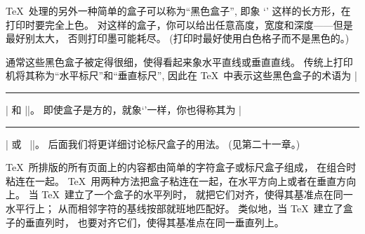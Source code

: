 \smallbreak
\TeX\ 处理的另外一种简单的盒子可以称为``黑色盒子'', 即象%
`\thinspace \vrule width 4pt height 6pt depth 1.5pt \thinspace'%
这样的长方形，在打印时要完全上色。%
对这样的盒子，你可以给出任意高度，宽度和深度——但是最好别太大，
否则打印墨可能耗尽。%
(打印时最好使用白色格子而不是黑色的。)

通常这些黑色盒子被定得很细，使得看起来象水平直线或垂直直线。%
传统上打印机将其称为``水平标尺''和``垂直标尺'',
因此在 \TeX\ 中表示这些黑色盒子的术语为 |\hrule| 和 |\vrule|。%
即使盒子是方的，就象`\thinspace\bull\thinspace'一样，你也得称其为 |\hrule| 或%
~|\vrule|。%
后面我们将更详细讨论标尺盒子的用法。%
(见第二十一章。)

\smallbreak
\TeX\ 所排版的所有页面上的内容都由简单的字符盒子或标尺盒子组成，
在组合时粘连在一起。%
\TeX\ 用两种方法把盒子粘连在一起，{在水平方向上}或者{在垂直方向上}。%
当 \TeX\ 建立了一个盒子的水平列时，
就把它们对齐，使得其基准点在同一水平行上；
从而相邻字符的基线按部就班地匹配好。%
类似地，当 \TeX\ 建立了盒子的垂直列时，
也要对齐它们，使得其基准点在同一垂直列上。

